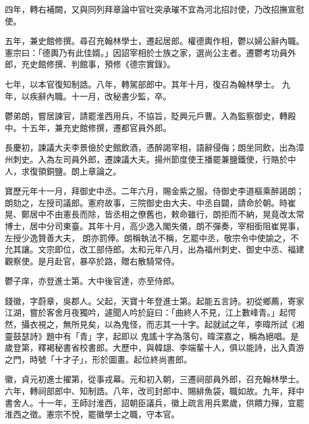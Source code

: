 \begin{pinyinscope}
 四年，轉右補闕，又與同列拜章論中官吐突承璀不宜為河北招討使，乃改招撫宣慰使。



 五年，兼史館修撰。尋召充翰林學士，遷起居郎。權德輿作相，鬱以婦公辭內職。憲宗曰：「德輿乃有此佳婿。」因詔宰相於士族之家，選尚公主者。遷鬱考功員外郎，充史館修撰、判館事，預修《德宗實錄》。



 七年，以本官復知制誥。八年，轉駕部郎中。其年十月，復召為翰林學士。
 九年，以疾辭內職。十一月，改秘書少監，卒。



 鬱弟朗，嘗居諫官，請罷淮西用兵，不協旨，貶興元戶曹。入為監察御史，轉殿中。十五年，兼充史館修撰，遷都官員外郎。



 長慶初，諫議大夫李景儉於史館飲酒，憑醉謁宰相，語辭侵侮；朗坐同飲，出為漳州刺史。入為左司員外郎，遷諫議大夫。揚州節度使王播罷兼鹽鐵使，行賂於中人，求復領銅鹽。朗上章論之。



 寶歷元年十一月，拜御史中丞。二年六月，賜金紫之服。侍御史李道樞乘醉謁朗；朗劾之，左授司議郎。憲府故事，三院御史由大夫、中丞自闢，請命於朝。時崔晃、鄭居中不由憲長而除，皆丞相之僚舊也，敕命雖行，朗拒而不納，晃竟改太常博士，居中分司東臺。其年十月，高少逸入閣失儀，朗不彈奏，宰相銜阻崔晃事，左授少逸贊善大夫，
 朗亦罰俸。朗稱執法不稱，乞罷中丞，敬宗令中使諭之，不允其讓。文宗即位，改工部侍郎。太和元年八月，出為福州刺史、御史中丞、福建觀察使。是月赴官，暴卒於路，贈右散騎常侍。



 鬱子庠，亦登進士第。大中後官達，亦至侍郎。



 錢徽，字蔚章，吳郡人。父起，天寶十年登進士第。起能五言詩。初從鄉薦，寄家江湖，嘗於客舍月夜獨吟，遽聞人吟於庭曰：「曲終人不見，江上數峰青。」起愕然，攝衣視之，無所見矣，以為鬼怪，而志其一十字。起就試之年，李暐所試《湘靈鼓瑟詩》題中有「青」字，起即以
 鬼謠十字為落句，暐深嘉之，稱為絕唱。是歲登第，釋褐秘書省校書郎。大歷中，與韓翃、李端輩十人，俱以能詩，出入貴游之門，時號「十才子」，形於圖畫。起位終尚書郎。



 徽，貞元初進士擢第，從事戎幕。元和初入朝，三遷祠部員外郎，召充翰林學士。六年，轉祠部郎中、知制誥。八年，改司封郎中、賜緋魚袋，職如故。九年，拜中書舍人。十一年，王師討淮西，詔朝臣議兵，徽上疏言用兵累歲，供饋力殫，宜罷淮西之徵。憲宗不悅，罷徽學士之職，守本官。




\end{pinyinscope}
